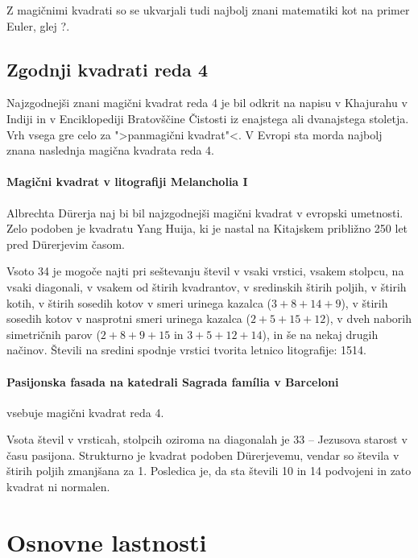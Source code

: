 \documentclass[a4paper,12pt]{article}
\begin{document}
Z magičnimi kvadrati so se ukvarjali tudi najbolj znani matematiki kot na
primer Euler, glej \pageref?. %


\subsection{Zgodnji kvadrati reda 4}

Najzgodnejši znani magični kvadrat reda 4 je bil odkrit na napisu
v Khajurahu v Indiji in v Enciklopediji Bratovščine Čistosti iz enajstega
ali dvanajstega stoletja. Vrh vsega gre celo za ">panmagični kvadrat"<.
V Evropi sta morda najbolj znana naslednja magična kvadrata reda 4.

\paragraph{Magični kvadrat v litografiji Melancholia I}
Albrechta Dürerja naj bi bil najzgodnejši magični kvadrat
v evropski umetnosti. Zelo podoben je kvadratu Yang Huija, ki je nastal na Kitajskem
približno 250 let pred Dürerjevim časom.

Vsoto 34 je mogoče najti pri seštevanju števil v vsaki vrstici, vsakem stolpcu,
na vsaki diagonali, v vsakem od štirih kvadrantov, v sredinskih štirih poljih,
v štirih kotih, v štirih sosedih kotov v smeri urinega kazalca (\(3+8+14+9\)), v
štirih sosedih kotov v nasprotni smeri urinega kazalca (\(2+5+15+12\)), v dveh naborih
simetričnih parov (\(2+8+9+15\) in \(3+5+12+14\)), in še na nekaj drugih načinov.
Števili na sredini spodnje vrstici tvorita letnico litografije: 1514.

\paragraph{Pasijonska fasada na katedrali Sagrada família v Barceloni}
vsebuje magični kvadrat reda 4.

Vsota števil v vrsticah, stolpcih oziroma na diagonalah je 33 -- Jezusova starost
v času pasijona. Strukturno je kvadrat podoben Dürerjevemu, vendar so števila
v štirih poljih zmanjšana za 1. Posledica je, da sta števili 10 in 14 podvojeni
in zato kvadrat ni normalen.


\section{Osnovne lastnosti}
\end{document}
